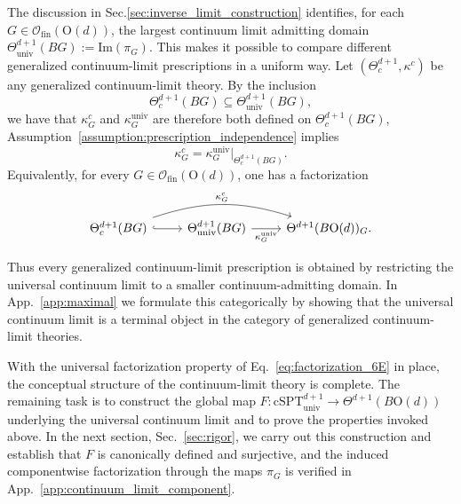 \documentclass[aps,prx,reprint,superscriptaddress,twocolumn,amsmath,amssymb,amsfonts, nofootinbib]{revtex4-2}
\newcommand{\ofin}{\mathcal{O}_{\text{fin}}}
\theoremstyle{apsstyle}
\begin{document}
The discussion in Sec.\ref{sec:inverse_limit_construction} identifies, for each $G\in \ofin(\mathrm{O}(d))$, the largest continuum limit admitting domain $\Theta^{d+1}_{\mathrm{univ}}(BG):=\mathrm{Im}(\pi_G)$. This makes it possible to compare different generalized continuum-limit prescriptions in a uniform way. Let $(\Theta^{d+1}_c,\kappa^{c})$ be any generalized continuum-limit theory. By the inclusion
\begin{equation*}
\Theta^{d+1}_c(BG)\subseteq \Theta^{d+1}_{\mathrm{univ}}(BG),
\end{equation*}
we have that $\kappa^c_G$ and $\kappa^{\mathrm{univ}}_G$ are therefore both defined on $\Theta^{d+1}_c(BG)$, Assumption~\ref{assumption:prescription_independence} implies
\begin{equation}
\kappa^c_G = \kappa^{\mathrm{univ}}_G \big\vert_{\Theta^{d+1}_c(BG)}.
\label{eq:universal_restriction_6E}
\end{equation}
Equivalently, for every $G\in \ofin(\mathrm{O}(d))$, one has a factorization
\begin{equation}
\label{eq:factorization_6E}
\begin{tikzcd}
\Theta^{d+1}_c(BG) \arrow[r, hook] \arrow[rr, bend left=18, "\kappa_{G}^{c}"]
& \Theta^{d+1}_{\mathrm{univ}}(BG) \arrow[r, "\kappa_G^{\mathrm{univ}}"']
& \Theta^{d+1}(B\mathrm{O}(d))_G .
\end{tikzcd}
\end{equation}

\noindent Thus every generalized continuum-limit prescription is obtained by restricting the universal continuum limit to a smaller continuum-admitting domain. In App.~\ref{app:maximal} we formulate this categorically by showing that the universal continuum limit is a terminal object in the category of generalized continuum-limit theories. 

\bigskip 

With the universal factorization property of Eq.~\eqref{eq:factorization_6E} in place, the conceptual structure of the continuum-limit theory is complete. The remaining task is to construct the global map $F:\mathrm{cSPT}^{d+1}_{\mathrm{univ}} \longrightarrow \Theta^{d+1}(B\mathrm{O}(d))$  underlying the universal continuum limit and to prove the properties invoked above. In the next section, Sec.~\ref{sec:rigor}, we carry out this construction and establish that $F$ is canonically defined and surjective, and the induced componentwise factorization through the maps $\pi_G$ is verified in App.~\ref{app:continuum_limit_component}.
\end{document}
